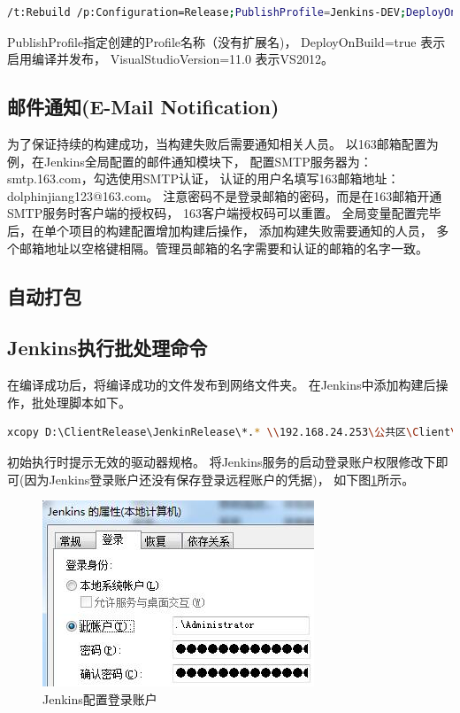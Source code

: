 \documentclass{book}
\begin{document}
\begin{lstlisting}[language=Bash]
/t:Rebuild /p:Configuration=Release;PublishProfile=Jenkins-DEV;DeployOnBuild=true;VisualStudioVersion=11.0   
\end{lstlisting}

PublishProfile指定创建的Profile名称（没有扩展名)，
DeployOnBuild=true 表示启用编译并发布，
VisualStudioVersion=11.0 表示VS2012。

\subsection{邮件通知(E-Mail Notification)}

为了保证持续的构建成功，当构建失败后需要通知相关人员。
以163邮箱配置为例，在Jenkins全局配置的邮件通知模块下，
配置SMTP服务器为：smtp.163.com，勾选使用SMTP认证，
认证的用户名填写163邮箱地址：dolphinjiang123@163.com。
注意密码不是登录邮箱的密码，而是在163邮箱开通SMTP服务时客户端的授权码，
163客户端授权码可以重置。
全局变量配置完毕后，在单个项目的构建配置增加构建后操作，
添加构建失败需要通知的人员，
多个邮箱地址以空格键相隔。管理员邮箱的名字需要和认证的邮箱的名字一致。

\subsection{自动打包}


\subsection{Jenkins执行批处理命令}

在编译成功后，将编译成功的文件发布到网络文件夹。
在Jenkins中添加构建后操作，批处理脚本如下。

\begin{lstlisting}[language=Bash]
xcopy D:\ClientRelease\JenkinRelease\*.* \\192.168.24.253\公共区\Client\2.0\Release /S /R /Y
\end{lstlisting}

初始执行时提示无效的驱动器规格。
将Jenkins服务的启动登录账户权限修改下即可(因为Jenkins登录账户还没有保存登录远程账户的凭据)，
如下图\ref{fig:JenkinsChangeLoginAccount}所示。

\begin{figure}[htbp]
	\centering
	\includegraphics[scale=0.8]{JenkinsChangeLoginAccount.jpg}
	\caption{Jenkins配置登录账户}
	\label{fig:JenkinsChangeLoginAccount}
\end{figure}
\end{document}
